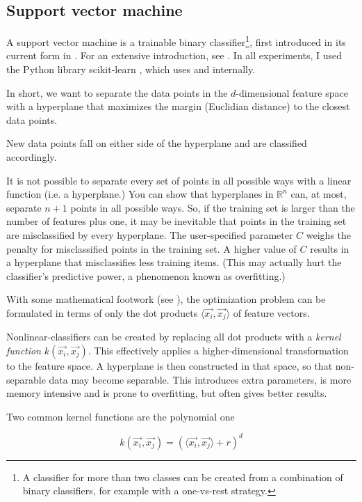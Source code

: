 \subsection{Support vector machine}

A support vector machine is a trainable binary classifier\footnote{A
classifier for more than two classes can be created from a combination of
binary classifiers, for example with a one-vs-rest strategy.}, first introduced in its current form in
\cite{Cortes1995}. For an extensive introduction, see \cite{Burges1998}.
In all experiments, I used the Python library scikit-learn
\cite{Pedregosa2011}, which uses \cite{Fan2014} and \cite{Chang2011}
internally.

In short, we want to separate the data points in the $d$-dimensional
feature space with a hyperplane that maximizes the margin (Euclidian
distance) to the closest data points. 

New data points fall on either side of the hyperplane and are classified
accordingly.

It is not possible to separate every set of points in all possible ways
with a linear function (i.e. a hyperplane.) You can show that hyperplanes
in $\mathbb{R}^{n}$ can, at most, separate $n + 1$ points in all possible
ways. So, if the training set is larger than the number of features plus
one, it may be inevitable that points in the training set are
misclassified by every hyperplane. The user-specified parameter $C$ weighs
the penalty for misclassified points in the training set. A higher value
of $C$ results in a hyperplane that misclassifies less training items.
(This may actually hurt the classifier's predictive power, a phenomenon
known as overfitting.) 

With some mathematical footwork (see \cite{Burges1998}), the optimization
problem can be formulated in terms of only the dot products $\langle
\vec{x_{i}}, \vec{x_{j}} \rangle$ of feature vectors. 

Nonlinear-classifiers can be created by replacing all dot products with
a \emph{kernel function} $k(\vec{x_{i}}, \vec{x_{j}})$. This effectively
applies a higher-dimensional transformation to the feature space.
A hyperplane is then constructed in that space, so that
non-separable data may become separable. This introduces extra parameters,
is more memory intensive and is prone to overfitting, but often gives
better results.

Two common kernel functions are the polynomial one

$$ k(\vec{x_{i}}, \vec{x_{j}}) = ( \langle \vec{x_{i}}, \vec{x_{j}}
\rangle + r )^{d} $$

